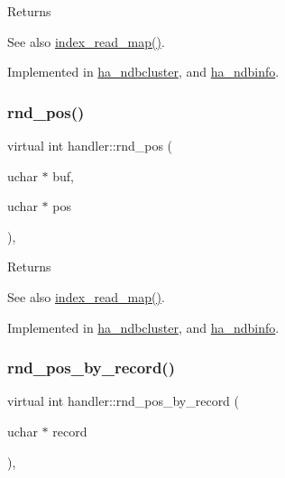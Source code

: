 \begin{DoxyReturn}{Returns}

\end{DoxyReturn}
\begin{DoxySeeAlso}{See also}
\mbox{\hyperlink{classhandler_af8c2b258691e5baac8dd22d19c084b37}{index\+\_\+read\+\_\+map()}}. 
\end{DoxySeeAlso}


Implemented in \mbox{\hyperlink{classha__ndbcluster_adc93bae43a800cc5ba5057b306136de1}{ha\+\_\+ndbcluster}}, and \mbox{\hyperlink{classha__ndbinfo_aafb71ce870019170b8949672a26387c3}{ha\+\_\+ndbinfo}}.

\mbox{\label{classhandler_adf659edd9d870e90c8974ae0eba7a082}} 
\subsubsection{\texorpdfstring{rnd\+\_\+pos()}{rnd\_pos()}}
{\footnotesize\ttfamily virtual int handler\+::rnd\+\_\+pos (\begin{DoxyParamCaption}\item[{uchar $\ast$}]{buf,  }\item[{uchar $\ast$}]{pos }\end{DoxyParamCaption})\hspace{0.3cm}{\ttfamily [protected]}, {}}

\begin{DoxyReturn}{Returns}

\end{DoxyReturn}
\begin{DoxySeeAlso}{See also}
\mbox{\hyperlink{classhandler_af8c2b258691e5baac8dd22d19c084b37}{index\+\_\+read\+\_\+map()}}. 
\end{DoxySeeAlso}


Implemented in \mbox{\hyperlink{classha__ndbcluster_a8980053ce56e386ced321a1ad88d1cc2}{ha\+\_\+ndbcluster}}, and \mbox{\hyperlink{classha__ndbinfo_a3c82928e6d10f1e83b118cc6fa7ce088}{ha\+\_\+ndbinfo}}.

\mbox{\label{classhandler_ac2be2fa5d347252f8a28dce931654b76}} 
\subsubsection{\texorpdfstring{rnd\+\_\+pos\+\_\+by\+\_\+record()}{rnd\_pos\_by\_record()}}
{\footnotesize\ttfamily virtual int handler\+::rnd\+\_\+pos\+\_\+by\+\_\+record (\begin{DoxyParamCaption}\item[{uchar $\ast$}]{record }\end{DoxyParamCaption})\hspace{0.3cm}{\ttfamily [inline]}, {\ttfamily [virtual]}}

